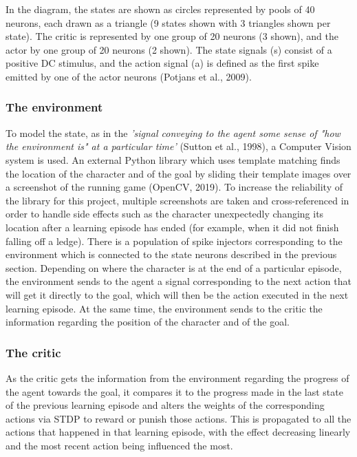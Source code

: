 \documentclass[10pt]{article}
\begin{document}
    In the diagram, the states are shown as circles represented by pools of 40 neurons, each drawn as a triangle (9 states shown with 3 triangles shown per state). The critic is represented by one group of 20 neurons (3 shown), and the actor by one group of 20 neurons (2 shown). The state signals (s) consist of a positive DC stimulus, and the action signal (a) is defined as the first spike emitted by one of the actor neurons (Potjans et al., 2009).

    \subsubsection{The environment}

    To model the state, as in the \textit{'signal conveying to the agent some sense of "how the environment is" at a particular time'} (Sutton et al., 1998), a Computer Vision system is used. An external Python library which uses template matching finds the location of the character and of the goal by sliding their template images over a screenshot of the running game (OpenCV, 2019). To increase the reliability of the library for this project, multiple screenshots are taken and cross-referenced in order to handle side effects such as the character unexpectedly changing its location after a learning episode has ended (for example, when it did not finish falling off a ledge). There is a population of spike injectors corresponding to the environment which is connected to the state neurons described in the previous section. Depending on where the character is at the end of a particular episode, the environment sends to the agent a signal corresponding to the next action that will get it directly to the goal, which will then be the action executed in the next learning episode. At the same time, the environment sends to the critic the information regarding the position of the character and of the goal.

    \subsubsection{The critic}

    As the critic gets the information from the environment regarding the progress of the agent towards the goal, it compares it to the progress made in the last state of the previous learning episode and alters the weights of the corresponding actions via STDP to reward or punish those actions. This is propagated to all the actions that happened in that learning episode, with the effect decreasing linearly and the most recent action being influenced the most.
\end{document}
